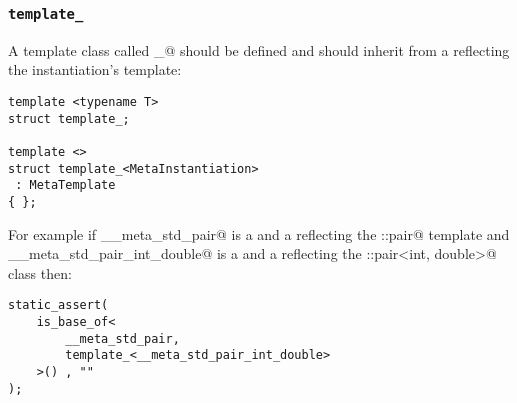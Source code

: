 \subsubsection{\texttt{template\_}}

A template class called \verb@template_@ should be defined and should
inherit from a  reflecting the instantiation's template:

\begin{verbatim}
template <typename T>
struct template_;

template <>
struct template_<MetaInstantiation>
 : MetaTemplate
{ };
\end{verbatim}

For example if \verb@__meta_std_pair@ is a  and a  reflecting
the \verb@std::pair@ template and \verb@__meta_std_pair_int_double@ is a 
and a  reflecting the \verb@std::pair<int, double>@ class then:

\begin{verbatim}
static_assert(
	is_base_of<
		__meta_std_pair,
		template_<__meta_std_pair_int_double>
	>() , ""
);
\end{verbatim}

